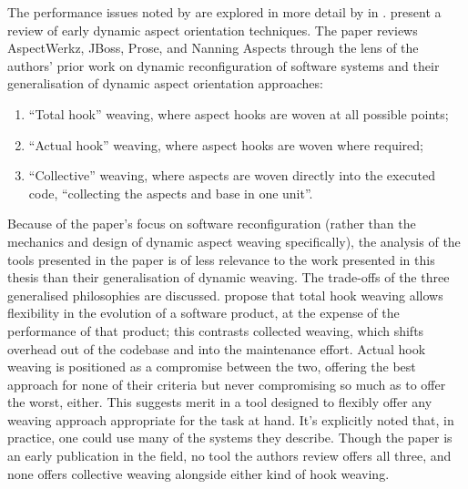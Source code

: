 
The performance issues noted by \citeauthor{popovici2003JITaspects} are explored
in more detail by \citeauthor{dynamicAOchitchyan} in \cite{dynamicAOchitchyan}.
\citeauthor{dynamicAOchitchyan} present a review of early dynamic aspect orientation
techniques. The paper reviews AspectWerkz, JBoss, Prose, and Nanning Aspects
through the lens of the authors' prior work on dynamic reconfiguration of
software systems and their generalisation of dynamic aspect orientation
approaches: 

\begin{enumerate}
\item ``Total hook'' weaving, where aspect hooks are woven at all possible
points; 
\item ``Actual hook'' weaving, where aspect hooks are woven where required;
\item ``Collective'' weaving, where aspects are woven directly into the executed
code, ``collecting the aspects and base in one unit''. 
\end{enumerate}

Because of the paper's focus on software reconfiguration (rather than the
mechanics and design of dynamic aspect weaving specifically), the analysis of
the tools presented in the paper is of less relevance to the work presented in
this thesis than their generalisation of dynamic weaving. The trade-offs of the
three generalised philosophies are discussed. \citeauthor{dynamicAOchitchyan}
propose that total hook weaving allows flexibility in the evolution of a
software product, at the expense of the performance of that product; this
contrasts collected weaving, which shifts overhead out of the codebase and into
the maintenance effort. Actual hook weaving is positioned as a compromise
between the two, offering the best approach for none of their criteria but never
compromising so much as to offer the worst, either. This suggests merit in a
tool designed to flexibly offer any weaving approach appropriate for the task at
hand. It's explicitly noted that, in practice, one could use many of the systems
they describe. Though the paper is an early publication in the field, no tool
the authors review offers all three, and none offers collective weaving
alongside either kind of hook weaving.



